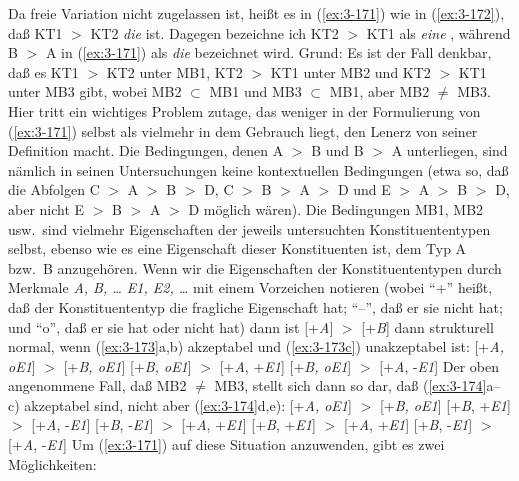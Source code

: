 \documentclass[output=paper]{langsci/langscibook}
\begin{document}
Da freie Variation nicht zugelassen ist, heißt es in (\ref{ex:3-171}) wie in (\ref{ex:3-172}), daß KT1 $>$ KT2 \textit{die}  ist. Dagegen bezeichne ich KT2 $>$ KT1 als \textit{eine} , während B $>$ A in (\ref{ex:3-171}) als \textit{die}  bezeichnet wird. Grund: Es ist der Fall denkbar, daß es KT1 $>$ KT2 unter MB1, KT2 $>$ KT1 unter MB2 und KT2 $>$ KT1 unter MB3 gibt, wobei MB2 $\subset$ MB1 und MB3 $\subset$ MB1, aber MB2 $\neq$ MB3. Hier tritt ein wichtiges Problem zutage, das weniger in der Formulierung von (\ref{ex:3-171}) selbst als vielmehr in dem Gebrauch liegt, den Lenerz von seiner Definition macht. Die Bedingungen, denen A $>$ B und B $>$ A unterliegen, sind nämlich in seinen Untersuchungen keine kontextuellen Bedingungen (etwa so, daß die Abfolgen C $>$ A $>$ B $>$ D, C $>$ B $>$ A $>$ D und E $>$ A $>$ B $>$ D, aber nicht E $>$ B $>$ A $>$ D möglich wären). Die Bedingungen MB1, MB2 usw.\ sind vielmehr Eigenschaften der
jeweils untersuchten Konstituententypen selbst, ebenso wie es eine
Eigenschaft dieser Konstituenten ist, dem Typ A bzw.\ B anzugehören. Wenn wir die Eigenschaften der Konstituententypen durch Merkmale \textit{A, B, \ldots{} E1, E2, \ldots} mit einem Vorzeichen notieren (wobei
"`+"' heißt, daß der Konstituententyp die fragliche Eigenschaft hat; "`--"', daß er sie nicht hat; und "`o"', daß er sie hat oder nicht hat) dann ist [+\textit{A}] $>$ [+\textit{B}] \zb dann strukturell normal, wenn (\ref{ex:3-173}a,b) akzeptabel und (\ref{ex:3-173c}) unakzeptabel ist:
\eal
\label{ex:3-173}
\ex
\label{ex:3-173a}
[+\textit{A, oE1}] $>$ [+\textit{B, oE1}]
\ex 
\label{ex:3-173b}
[+\textit{B, oE1}]\hspace{0.1em} $>$ [+\textit{A}, +\textit{E1}]
\ex
\label{ex:3-173c}
[+\textit{B, oE1}]\hspace{0.1em} $>$ [+\textit{A}, -\textit{E1}]
\zl
Der oben angenommene Fall, daß MB2 $\neq$ MB3, stellt sich dann so
dar, daß \zb (\ref{ex:3-174}a--c) akzeptabel sind, nicht aber (\ref{ex:3-174}d,e):
\eal
\label{ex:3-174}
\ex
\label{ex:3-174a}
[+\textit{A, oE1}] $>$ [+\textit{B, oE1}]
\ex
\label{ex:3-174b}
[+\textit{B}, +\textit{E1}] $>$ [+\textit{A}, -\textit{E1}]
\ex
\label{ex:3-174c}
[+\textit{B}, -\textit{E1}]\hspace{0.2em} $>$ [+\textit{A}, +\textit{E1}]
\ex
\label{ex:3-174d}
[+\textit{B}, +\textit{E1}] $>$ [+\textit{A}, +\textit{E1}]
\ex
\label{ex:3-174e}
[+\textit{B}, -\textit{E1}]\hspace{0.2em} $>$ [+\textit{A}, -\textit{E1}]
\zl
Um (\ref{ex:3-171}) auf diese Situation anzuwenden, gibt es zwei Möglichkeiten:
\end{document}
